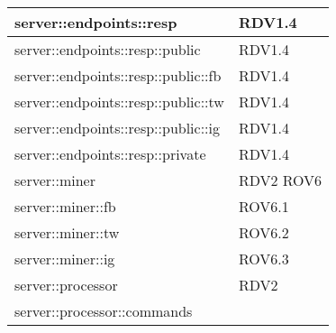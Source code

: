 \begin{center}
\begin{longtable}{| p{9cm} | p{4cm} |}
\hline
server::endpoints::resp  &  RDV1.4 \newline \\
\hline
server::endpoints::resp::public  &  RDV1.4 \newline \\
\hline
server::endpoints::resp::public::fb  &  RDV1.4 \newline\\
\hline
server::endpoints::resp::public::tw  &  RDV1.4 \newline \\
\hline
server::endpoints::resp::public::ig  &  RDV1.4 \newline \\
\hline
server::endpoints::resp::private  &  RDV1.4 \newline \\
\hline
server::miner  & RDV2 \newline ROV6 \newline \\
\hline
server::miner::fb  &  ROV6.1 \newline \\
\hline
server::miner::tw  &  ROV6.2 \newline \\
\hline
server::miner::ig  &  ROV6.3 \newline \\
\hline
server::processor  & RDV2 \newline \\
\hline
server::processor::commands  & \newline \\
\hline

\end{longtable}
\end{center}
